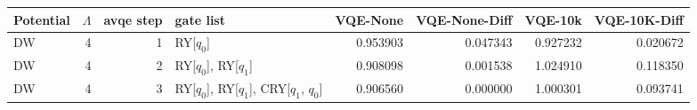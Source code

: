 \begin{tabular}{lrrlrrrr}
\toprule
Potential & $\Lambda$ & avqe step & gate list & VQE-None & VQE-None-Diff & VQE-10k & VQE-10K-Diff \\
\midrule
DW & 4 & 1 & RY[$q_0$] & 0.953903 & 0.047343 & 0.927232 & 0.020672 \\
DW & 4 & 2 & RY[$q_0$], RY[$q_1$] & 0.908098 & 0.001538 & 1.024910 & 0.118350 \\
DW & 4 & 3 & RY[$q_0$], RY[$q_1$], CRY[$q_1$, $q_0$] & 0.906560 & 0.000000 & 1.000301 & 0.093741 \\
\bottomrule
\end{tabular}
